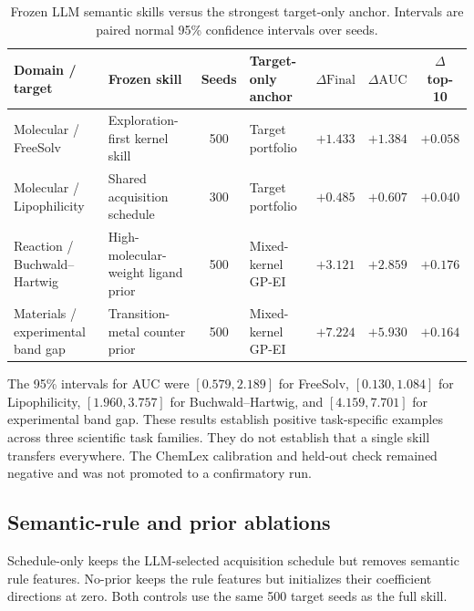 \documentclass[pdflatex,sn-nature]{sn-jnl}
\newcommand{\dauc}{\Delta\mathrm{AUC}}
\newcommand{\dfinal}{\Delta\mathrm{Final}}
\begin{document}
\begin{appendices}
\begin{table}[t]
\centering
\caption{Frozen LLM semantic skills versus the strongest target-only anchor.
Intervals are paired normal 95\% confidence intervals over seeds.}
\label{tab:semantic_headline}
\small
\begin{tabularx}{\textwidth}{>{\raggedright\arraybackslash}X >{\raggedright\arraybackslash}X c >{\raggedright\arraybackslash}X c c c}
\toprule
Domain / target & Frozen skill & Seeds & Target-only anchor & $\dfinal$ & $\dauc$ & $\Delta$ top-10 \\
\midrule
Molecular / FreeSolv & Exploration-first kernel skill & 500 & Target portfolio & $+1.433$ & $+1.384$ & $+0.058$ \\
Molecular / Lipophilicity & Shared acquisition schedule & 300 & Target portfolio & $+0.485$ & $+0.607$ & $+0.040$ \\
Reaction / Buchwald--Hartwig & High-molecular-weight ligand prior & 500 & Mixed-kernel GP-EI & $+3.121$ & $+2.859$ & $+0.176$ \\
Materials / experimental band gap & Transition-metal counter prior & 500 & Mixed-kernel GP-EI & $+7.224$ & $+5.930$ & $+0.164$ \\
\bottomrule
\end{tabularx}
\end{table}

The 95\% intervals for AUC were $[0.579,2.189]$ for FreeSolv,
$[0.130,1.084]$ for Lipophilicity, $[1.960,3.757]$ for
Buchwald--Hartwig, and $[4.159,7.701]$ for experimental band gap. These
results establish positive task-specific examples across three scientific
task families. They do not establish that a single skill transfers everywhere.
The ChemLex calibration and held-out check remained negative and was not
promoted to a confirmatory run.

\subsection{Semantic-rule and prior ablations}

Schedule-only keeps the LLM-selected acquisition schedule but removes semantic
rule features. No-prior keeps the rule features but initializes their
coefficient directions at zero. Both controls use the same 500 target seeds as
the full skill.


\end{appendices}
\end{document}

